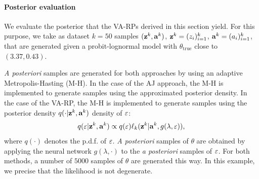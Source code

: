 
\paragraph{Posterior evaluation}
We evaluate the posterior that the VA-RPs derived in this section yield.
For this purpose, we take as dataset $k=50$ samples $(\mathbf{z}^k,\mathbf{a}^k)$, $\mathbf{z}^k=(z_i)_{i=1}^k$, $\mathbf{a}^k=(a_i)_{i=1}^k$, that are generated given a probit-lognormal model with $\theta_{\text{true}}$ close to $(3.37, 0.43)$. %

\emph{A posteriori} samples are generated for both approaches by using an adaptive Metropolis-Hasting (M-H).
In the case of the AJ approach, the M-H is implemented to generate samples using the approximated posterior density.
In the case of the VA-RP, the M-H is implemented to generate samples using the posterior density $q(\cdot|\mathbf{z}^k,\mathbf{a}^k)$ density of $\varepsilon$:
    \begin{equation}
        q(\varepsilon|\mathbf{z}^k,\mathbf{a}^k) \propto q(\varepsilon)\ell_k(\mathbf{z}^k|\mathbf{a}^k,g(\lambda,\varepsilon)),
    \end{equation}
where $q(\cdot)$ denotes the p.d.f. of $\varepsilon$.
\emph{A posteriori} samples of $\theta$ are obtained by applying the neural network $g(\lambda,\cdot)$ to the \emph{a posteriori} samples of $\varepsilon$.
For both methods, a number of $5000$ samples of $\theta$ are generated this way.
In this example, 
we precise that the likelihood is not degenerate.






